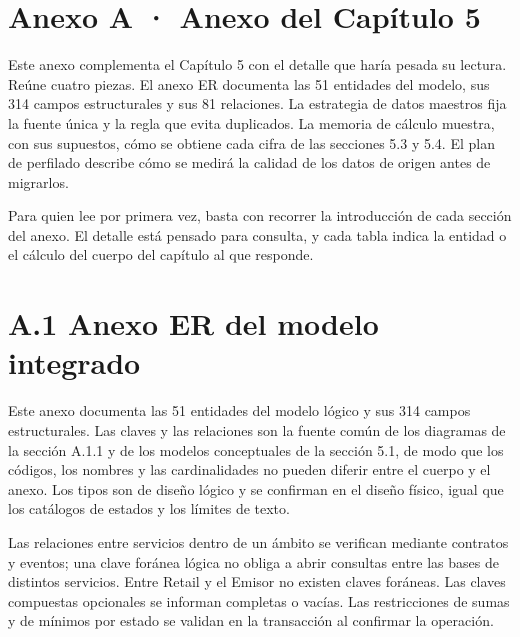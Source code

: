 \documentclass[11pt]{article}
\begin{document}
\renewcommand{\tablename}{Tabla}
\renewcommand{\figurename}{Figura}
\renewcommand{\thetable}{A.\arabic{table}}
\renewcommand{\thefigure}{A.\arabic{figure}}

\tableofcontents
\clearpage
\renewcommand{\listfigurename}{Lista de figuras}
\listoffigures
\clearpage
\renewcommand{\listtablename}{Lista de tablas}
\listoftables
\clearpage

\section{Anexo A · Anexo del Capítulo 5}\label{anexo-5}

Este anexo complementa el Capítulo 5 con el detalle que haría pesada su lectura. Reúne cuatro piezas. El anexo ER documenta las 51 entidades del modelo, sus 314 campos estructurales y sus 81 relaciones. La estrategia de datos maestros fija la fuente única y la regla que evita duplicados. La memoria de cálculo muestra, con sus supuestos, cómo se obtiene cada cifra de las secciones 5.3 y 5.4. El plan de perfilado describe cómo se medirá la calidad de los datos de origen antes de migrarlos.

Para quien lee por primera vez, basta con recorrer la introducción de cada sección del anexo. El detalle está pensado para consulta, y cada tabla indica la entidad o el cálculo del cuerpo del capítulo al que responde.

\section{A.1 Anexo ER del modelo integrado}

Este anexo documenta las 51 entidades del modelo lógico y sus 314 campos estructurales. Las claves y las relaciones son la fuente común de los diagramas de la sección A.1.1 y de los modelos conceptuales de la sección 5.1, de modo que los códigos, los nombres y las cardinalidades no pueden diferir entre el cuerpo y el anexo. Los tipos son de diseño lógico y se confirman en el diseño físico, igual que los catálogos de estados y los límites de texto.

Las relaciones entre servicios dentro de un ámbito se verifican mediante contratos y eventos; una clave foránea lógica no obliga a abrir consultas entre las bases de distintos servicios. Entre Retail y el Emisor no existen claves foráneas. Las claves compuestas opcionales se informan completas o vacías. Las restricciones de sumas y de mínimos por estado se validan en la transacción al confirmar la operación.
\end{document}
